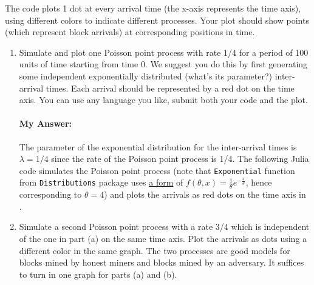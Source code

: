 \documentclass{article}
\begin{document}
The code plots 1 dot at every arrival time (the x-axis represents the time axis), using different colors to indicate different processes.  Your plot should show points (which represent block arrivals) at corresponding positions in time.


\begin{enumerate}[label=(\alph*)]
    \item Simulate and plot one Poisson point process with rate 1/4 for a period of 100 units of time starting from time 0.  We suggest you do this by first generating some independent exponentially distributed (what's its parameter?) inter-arrival times.  Each arrival should be represented by a red dot on the time axis.  You can use any language you like, submit both your code and the plot.
    \paragraph{My Answer:} The parameter of the exponential distribution for the inter-arrival times is \( \lambda = 1/4 \) since the rate of the Poisson point process is 1/4. The following Julia code simulates the Poisson point process (note that \texttt{Exponential} function from \texttt{Distributions} package uses \href{https://juliastats.org/Distributions.jl/stable/univariate/#Distributions.Exponential}{a form} of \( f(\theta, x) = \frac 1 \theta e^{-\frac x \theta} \), hence corresponding to \(\theta = 4 \)) and plots the arrivals as red dots on the time axis in .
    \item Simulate a second Poisson point process with a rate 3/4 which is independent of the one in part (a) on the same time axis.  Plot the arrivals as dots using a different color in the same graph.  The two processes are good models for blocks mined by honest miners and blocks mined by an adversary.  It suffices to turn in one graph for parts (a) and (b).

\end{enumerate}
\end{document}
